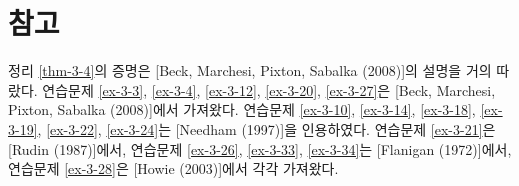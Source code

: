 \section{참고}

정리 \ref{thm-3-4}의 증명은 [Beck, Marchesi, Pixton, Sabalka (2008)]의 설명을
거의 따랐다. 연습문제 \ref{ex-3-3}, \ref{ex-3-4}, \ref{ex-3-12}, \ref{ex-3-20}, \ref{ex-3-27}은
[Beck, Marchesi, Pixton, Sabalka (2008)]에서 가져왔다.
연습문제 \ref{ex-3-10}, \ref{ex-3-14}, \ref{ex-3-18}, \ref{ex-3-19}, \ref{ex-3-22}, \ref{ex-3-24}는
[Needham (1997)]을 인용하였다.
연습문제 \ref{ex-3-21}은 [Rudin (1987)]에서, 
연습문제 \ref{ex-3-26}, \ref{ex-3-33}, \ref{ex-3-34}는 [Flanigan (1972)]에서,
연습문제 \ref{ex-3-28}은 [Howie (2003)]에서 각각 가져왔다.

